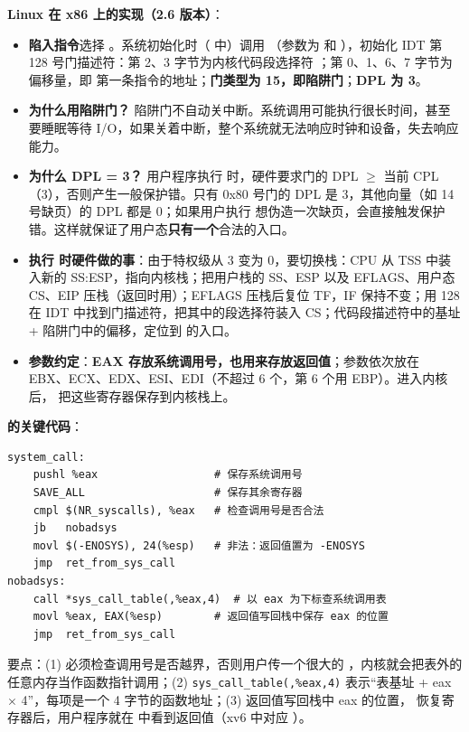 \textbf{Linux 在 x86 上的实现（2.6 版本）}：
\begin{itemize}
    \item \textbf{陷入指令}选择 。系统初始化时（ 中）调用 （参数为  和 ），初始化 IDT 第 128 号门描述符：第 2、3 字节为内核代码段选择符 ；第 0、1、6、7 字节为偏移量，即  第一条指令的地址；\textbf{门类型为 15，即陷阱门}；\textbf{DPL 为 3}。
    \item \textbf{为什么用陷阱门？} 陷阱门不自动关中断。系统调用可能执行很长时间，甚至要睡眠等待 I/O，如果关着中断，整个系统就无法响应时钟和设备，失去响应能力。
    \item \textbf{为什么 DPL = 3？} 用户程序执行  时，硬件要求门的 DPL $\ge$ 当前 CPL（3），否则产生一般保护错。只有 0x80 号门的 DPL 是 3，其他向量（如 14 号缺页）的 DPL 都是 0；如果用户执行  想伪造一次缺页，会直接触发保护错。这样就保证了用户态\textbf{只有一个}合法的入口。
    \item \textbf{执行  时硬件做的事}：由于特权级从 3 变为 0，要切换栈：CPU 从 TSS 中装入新的 SS:ESP，指向内核栈；把用户栈的 SS、ESP 以及 EFLAGS、用户态 CS、EIP 压栈（返回时用）；EFLAGS 压栈后复位 TF，IF 保持不变；用 128 在 IDT 中找到门描述符，把其中的段选择符装入 CS；代码段描述符中的基址 + 陷阱门中的偏移，定位到  的入口。
    \item \textbf{参数约定}：\textbf{EAX 存放系统调用号，也用来存放返回值}；参数依次放在 EBX、ECX、EDX、ESI、EDI（不超过 6 个，第 6 个用 EBP）。进入内核后， 把这些寄存器保存到内核栈上。
\end{itemize}

\textbf{ 的关键代码}：\par
\begin{lstlisting}
system_call:
    pushl %eax                  # 保存系统调用号
    SAVE_ALL                    # 保存其余寄存器
    cmpl $(NR_syscalls), %eax   # 检查调用号是否合法
    jb   nobadsys
    movl $(-ENOSYS), 24(%esp)   # 非法：返回值置为 -ENOSYS
    jmp  ret_from_sys_call
nobadsys:
    call *sys_call_table(,%eax,4)  # 以 eax 为下标查系统调用表
    movl %eax, EAX(%esp)        # 返回值写回栈中保存 eax 的位置
    jmp  ret_from_sys_call
\end{lstlisting}
要点：(1) 必须检查调用号是否越界，否则用户传一个很大的 ，内核就会把表外的任意内存当作函数指针调用；(2) \texttt{sys\_call\_table(,\%eax,4)} 表示“表基址 + eax $\times$ 4”，每项是一个 4 字节的函数地址；(3) 返回值写回栈中 eax 的位置， 恢复寄存器后，用户程序就在  中看到返回值（xv6 中对应 ）。

